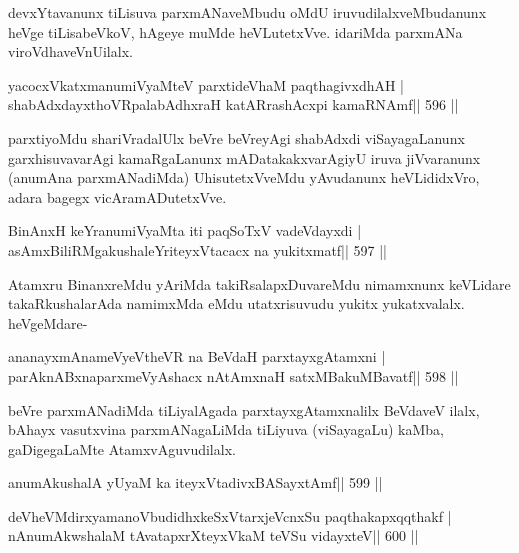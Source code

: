 \begin{artha}
devxYtavanunx tiLisuva parxmANaveMbudu oMdU iruvudilalxveMbudanunx heVge tiLisabeVkoV, hAgeye muMde heVLutetxVve. idariMda parxmANa viroVdhaveVnUilalx.
\end{artha}

\begin{shl}
yacocxVkatxmanumiVyaMteV parxtideVhaM paqthagivxdhAH |
shabAdxdayxthoVRpalabAdhxraH katARrashAcxpi kamaRNAmf\hfill || 596 ||
\end{shl}

\begin{artha}
parxtiyoMdu shariVradalUlx beVre beVreyAgi shabAdxdi viSayagaLanunx
garxhisuvavarAgi kamaRgaLanunx mADatakakxvarAgiyU iruva jiVvaranunx
(anumAna parxmANadiMda) UhisutetxVveMdu yAvudanunx heVLididxVro, adara
bagegx vicAra\break mADutetxVve.
\end{artha}

\begin{shl}
BinAnxH keYranumiVyaMta iti paqSoTxV vadeVdayxdi |
asAmxBiliRMgakushaleYriteyxVtacacx na yukitxmatf\hfill || 597 ||
\end{shl}

\begin{artha}
Atamxru BinanxreMdu yAriMda takiRsalapxDuvareMdu nimamxnunx keVLidare
takaRkushalarAda namimxMda eMdu utatxrisuvudu yukitx yukatxvalalx.
heVgeMdare-
\end{artha}

\begin{shl}
ananayxmAnameVyeV\s theVR na BeVdaH parxtayxgAtamxni |
parAknABxnaparxmeVyAshacx nA\s\s tAmxnaH satxMBakuMBavatf\hfill || 598 ||
\end{shl}

\begin{artha}
beVre parxmANadiMda tiLiyalAgada parxtayxgAtamxnalilx BeVdaveV ilalx, bAhayx vasutxvina parxmANagaLiMda tiLiyuva (viSayagaLu) kaMba, gaDigegaLaMte AtamxvAguvudilalx.
\end{artha}



\begin{shl}
anumAkushalA yUyaM ka iteyxVtadivxBASayxtAmf\hfill || 599 ||
\end{shl}

\begin{shl}
deVheVMdirxyamanoVbudidhxkeSxVtarxjeVcnxSu paqthakapxqqthakf |
nAnumAkwshalaM tAvatapxrXteyxVkaM teVSu vidayxteV\hfill || 600 ||
\end{shl}

